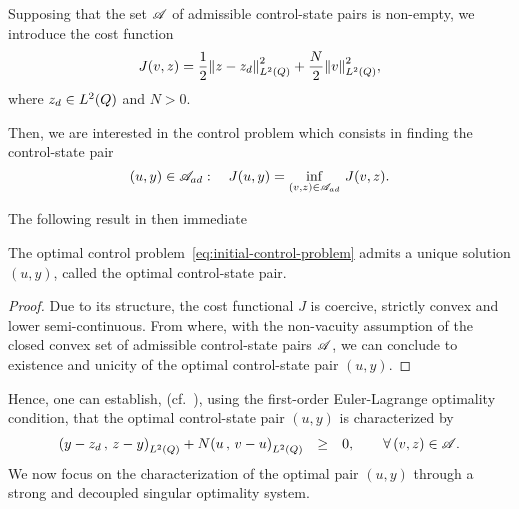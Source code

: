 Supposing that the set $\mathscr{A}$ of admissible control-state pairs is
non-empty, we introduce the cost function
\begin{equation*}\label{eq:initial-cost-function}
    J(v,z) = \dfrac{1}{2}{\left\|{z - z_{d} }\right\|}_{L^{2}\left({Q}\right)}^{2} + \dfrac{N}{2}{\left\|{v }\right\|}_{L^{2}\left({Q}\right)}^{2},
\end{equation*}
where $z_{d}\in L^{2}\!\left({Q}\right)$ and $N > 0$.

Then, we are interested in the control problem which consists in finding
the control-state pair
\begin{equation}\label{eq:initial-control-problem}
    (u,y)\in {\mathscr{A}}_{ad}:\quad J(u,y) = \inf_{(v,z)\in
    {\mathscr{A}}_{ad}}\,J(v,z).
\end{equation}

The following result in then immediate
\begin{theoreme}%
    The optimal control problem~\eqref{eq:initial-control-problem} admits a
    unique solution $(u,y)$, called the optimal control-state pair.
\end{theoreme}

\begin{proof}%
    Due to its structure, the cost functional $J$ is coercive, strictly
    convex and lower semi-continuous. From where, with the non-vacuity
    assumption of the closed convex set of admissible control-state pairs
    $\mathscr{A}$, we can conclude to existence and unicity of the optimal
    control-state pair $(u,y)$.
\end{proof}

Hence, one can establish, (cf.~\cite{lions2}), using the first-order
Euler-Lagrange optimality condition, that the optimal control-state pair
$(u,y)$ is characterized by
\begin{equation*}\label{eq:initial-variational-inequation}
    \begin{array}{rcl}
        \scalaireq{%
            y - z_{d}
        }{%
            z - y
        } + N\scalaireq{u}{v - u} & \geq & 0,\qquad \forall\,(v,z)\in\Ascr.
    \end{array}
\end{equation*}
We now focus on the characterization of the optimal pair $(u,y)$ through a
strong and decoupled singular optimality system.

